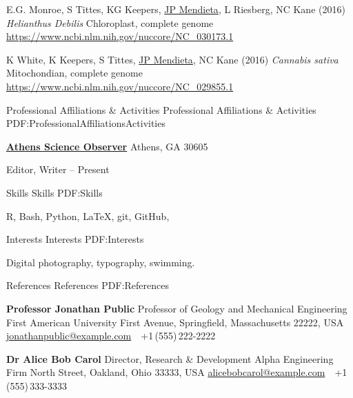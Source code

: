 \documentclass[letterpaper,MMMyyyy,nonstopmode]{simpleresumecv}
\begin{document}
\begin{Body}
\Gap
\NumberedItem{[2]}
{E.G. Monroe, S Tittes, KG Keepers, \underline{JP Mendieta}, L Riesberg, NC Kane
(2016)
 \textit{Helianthus Debilis} Chloroplast, complete genome
\url{https://www.ncbi.nlm.nih.gov/nuccore/NC_030173.1}}


\Gap
\NumberedItem{[1]}
{K White, K Keepers, S Tittes, \underline{JP Mendieta}, NC Kane
(2016)
 \textit{Cannabis sativa} Mitochondian, complete genome
\url{https://www.ncbi.nlm.nih.gov/nuccore/NC_029855.1}}

\endgroup





\Section
{Professional Affiliations
\newline
\& Activities}
{Professional Affiliations \& Activities}
{PDF:ProfessionalAffiliationsActivities}

\Entry
\href{http://www.example.com/my-society}
{\textbf{Athens Science Observer}}
\newline
Athens, GA 30605

\Gap
\BulletItem
Editor, Writer
\hfill
{} --
Present




\iffalse


\Section
{Skills}
{Skills}
{PDF:Skills}

\Entry
R,
Bash,
Python,
{\LaTeX},
git,
GitHub,





\Section
{Interests}
{Interests}
{PDF:Interests}

\Entry
Digital photography,
typography,
swimming.


\Section
{References}
{References}
{PDF:References}

\BulletItem
\textbf{Professor Jonathan Public}
\newline
Professor of Geology and Mechanical Engineering
\newline
First American University
 First Avenue, Springfield, Massachusetts 22222, USA
\newline
\href{mailto:jonathanpublic@example.com}
{jonathanpublic@example.com}
\,\SubBulletSymbol\,
+1\,(555)\,222-2222

\BigGap
\BulletItem
\textbf{Dr Alice Bob Carol}
\newline
Director, Research \& Development
\newline
Alpha Engineering Firm
 North Street, Oakland, Ohio 33333, USA
\newline
\href{mailto:alicebobcarol@example.com}
{alicebobcarol@example.com}
\,\SubBulletSymbol\,
+1\,(555)\,333-3333





\end{Body}
\end{document}
